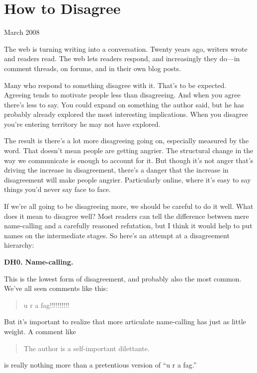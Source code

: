 \chapter{How to Disagree}

March 2008

The web is turning writing into a conversation. Twenty years ago,
writers wrote and readers read. The web lets readers respond, and
increasingly they do---in comment threads, on forums, and in their own
blog posts.

Many who respond to something disagree with it. That's to be expected.
Agreeing tends to motivate people less than disagreeing. And when you
agree there's less to say. You could expand on something the author
said, but he has probably already explored the most interesting
implications. When you disagree you're entering territory he may not
have explored.

The result is there's a lot more disagreeing going on, especially
measured by the word. That doesn't mean people are getting angrier. The
structural change in the way we communicate is enough to account for it.
But though it's not anger that's driving the increase in disagreement,
there's a danger that the increase in disagreement will make people
angrier. Particularly online, where it's easy to say things you'd never
say face to face.

If we're all going to be disagreeing more, we should be careful to do it
well. What does it mean to disagree well? Most readers can tell the
difference between mere name-calling and a carefully reasoned
refutation, but I think it would help to put names on the intermediate
stages. So here's an attempt at a disagreement hierarchy:

\textbf{DH0. Name-calling.}

This is the lowest form of disagreement, and probably also the most
common. We've all seen comments like this:

\begin{quote}
u r a fag!!!!!!!!!!
\end{quote}

But it's important to realize that more articulate name-calling has just
as little weight. A comment like

\begin{quote}
The author is a self-important dilettante.
\end{quote}

is really nothing more than a pretentious version of ``u r a fag.''

